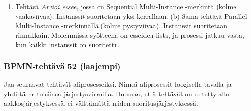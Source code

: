 \documentclass[
  finnish,
  letterpaper,
  DIV=11,
  numbers=noendperiod,
  oneside]{scrreprt}
\providecommand{\tightlist}{%
  \setlength{\itemsep}{0pt}\setlength{\parskip}{0pt}}
\begin{document}
\begin{tcolorbox}[enhanced jigsaw, arc=.35mm, bottomrule=.15mm, bottomtitle=1mm, breakable, colback=white, colbacktitle=quarto-callout-tip-color!10!white, colframe=quarto-callout-tip-color-frame, coltitle=black, left=2mm, leftrule=.75mm, opacityback=0, opacitybacktitle=0.6, rightrule=.15mm, title=\textcolor{quarto-callout-tip-color}{\faLightbulb}\hspace{0.5em}{Malliratkaisu}, titlerule=0mm, toprule=.15mm, toptitle=1mm]

\begin{enumerate}
\def\labelenumi{(\alph{enumi})}
\tightlist
\item
  Tehtävä \emph{Arvioi essee}, jossa on Sequential Multi-Instance
  -merkintä (kolme vaakaviivaa). Instanssit suoritetaan yksi kerrallaan.
  (b) Sama tehtävä Parallel Multi-Instance -merkinnällä (kolme
  pystyviivaa). Instanssit suoritetaan rinnakkain. Molemmissa syötteenä
  on esseiden lista, ja prosessi jatkuu vasta, kun kaikki instanssit on
  suoritettu.
\end{enumerate}

\end{tcolorbox}

\subsubsection{BPMN-tehtävä 52
(laajempi)}\label{bpmn-tehtuxe4vuxe4-52-laajempi}

Jaa seuraavat tehtävät aliprosesseiksi. Nimeä aliprosessit loogisella
tavalla ja yhdistä ne toisiinsa järjestysvirroilla. Huomaa, että
tehtävät on esitetty alla aakkosjärjestyksessä, ei välttämättä niiden
suoritusjärjestyksessä.
\end{document}
